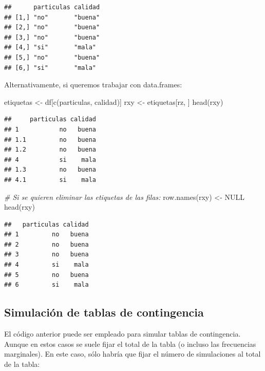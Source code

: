 \documentclass[
]{book}
\newenvironment{Shaded}{\begin{snugshade}}{\end{snugshade}}
\newcommand{\CommentTok}[1]{\textcolor[rgb]{0.56,0.35,0.01}{\textit{#1}}}
\newcommand{\ConstantTok}[1]{\textcolor[rgb]{0.00,0.00,0.00}{#1}}
\newcommand{\FunctionTok}[1]{\textcolor[rgb]{0.00,0.00,0.00}{#1}}
\newcommand{\NormalTok}[1]{#1}
\newcommand{\OtherTok}[1]{\textcolor[rgb]{0.56,0.35,0.01}{#1}}
\newcommand{\StringTok}[1]{\textcolor[rgb]{0.31,0.60,0.02}{#1}}
\theoremstyle{break}
\theoremstyle{definition}
\theoremstyle{definition}
\theoremstyle{definition}
\theoremstyle{definition}
\theoremstyle{remark}
\begin{document}
\begin{verbatim}
##      particulas calidad
## [1,] "no"       "buena"
## [2,] "no"       "buena"
## [3,] "no"       "buena"
## [4,] "si"       "mala" 
## [5,] "no"       "buena"
## [6,] "si"       "mala"
\end{verbatim}

Alternativamente, si queremos trabajar con data.frames:

\begin{Shaded}
\begin{Highlighting}[]
\NormalTok{etiquetas }\OtherTok{\textless{}{-}}\NormalTok{ df[}\FunctionTok{c}\NormalTok{(}\StringTok{\textquotesingle{}particulas\textquotesingle{}}\NormalTok{, }\StringTok{\textquotesingle{}calidad\textquotesingle{}}\NormalTok{)]}
\NormalTok{rxy }\OtherTok{\textless{}{-}}\NormalTok{ etiquetas[rz, ]}
\FunctionTok{head}\NormalTok{(rxy)}
\end{Highlighting}
\end{Shaded}

\begin{verbatim}
##     particulas calidad
## 1           no   buena
## 1.1         no   buena
## 1.2         no   buena
## 4           si    mala
## 1.3         no   buena
## 4.1         si    mala
\end{verbatim}

\begin{Shaded}
\begin{Highlighting}[]
\CommentTok{\# Si se quieren eliminar las etiquetas de las filas:}
\FunctionTok{row.names}\NormalTok{(rxy) }\OtherTok{\textless{}{-}} \ConstantTok{NULL}
\FunctionTok{head}\NormalTok{(rxy)}
\end{Highlighting}
\end{Shaded}

\begin{verbatim}
##   particulas calidad
## 1         no   buena
## 2         no   buena
## 3         no   buena
## 4         si    mala
## 5         no   buena
## 6         si    mala
\end{verbatim}

\hypertarget{simconting}{%
\subsection{Simulación de tablas de contingencia}\label{simconting}}

El código anterior puede ser empleado para simular tablas de contingencia.
Aunque en estos casos se suele fijar el total de la tabla (o incluso las frecuencias marginales).
En este caso, sólo habría que fijar el número de simulaciones al total de la tabla:
\end{document}
